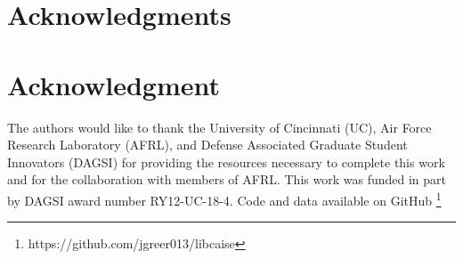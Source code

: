 \ifCLASSOPTIONcompsoc
  \section*{Acknowledgments}
\else
  \section*{Acknowledgment}
\fi


The authors would like to thank the University of Cincinnati (UC), Air Force Research Laboratory (AFRL), and Defense Associated Graduate Student Innovators (DAGSI) for providing the resources necessary to complete this work and for the collaboration with members of AFRL. This work was funded in part by DAGSI award number RY12-UC-18-4. Code and data available on GitHub \footnote{https://github.com/jgreer013/libcaise}